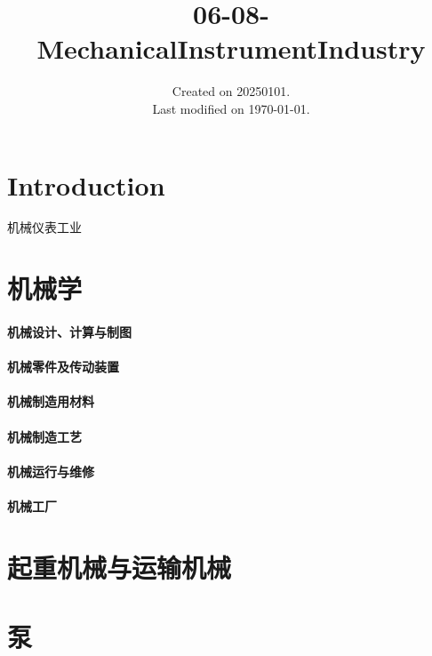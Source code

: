 \documentclass[UTF8]{../../ApplicationUniverse}
\begin{document}
\title{06-08-MechanicalInstrumentIndustry}
\date{Created on 20250101.\\   Last modified on \today.}
\maketitle
\tableofcontents


\chapter{Introduction}

机械仪表工业





\chapter{机械学}
\subsubsection{机械设计、计算与制图}
\subsubsection{机械零件及传动装置}
\subsubsection{机械制造用材料}
\subsubsection{机械制造工艺}
\subsubsection{机械运行与维修}
\subsubsection{机械工厂}



\chapter{起重机械与运输机械}



\chapter{泵}
\end{document}
